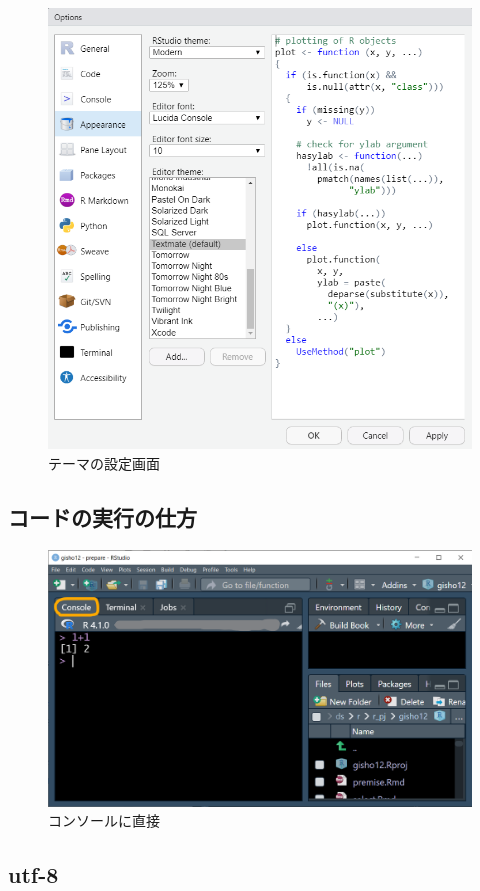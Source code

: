\documentclass[
  xelatex,ja=standard, b5paper]{bxjsbook}
\begin{document}
\begin{figure}

{\centering \includegraphics[width=0.7\linewidth]{images/appearance} 

}

\caption{テーマの設定画面}\label{fig:appearance}
\end{figure}

\hypertarget{p-howtorun}{%
\subsection{コードの実行の仕方}\label{p-howtorun}}

\begin{figure}

{\centering \includegraphics[width=0.7\linewidth]{images/pane} 

}

\caption{コンソールに直接}\label{fig:pane}
\end{figure}

\hypertarget{utf-8}{%
\subsection{utf-8}\label{utf-8}}
\end{document}
